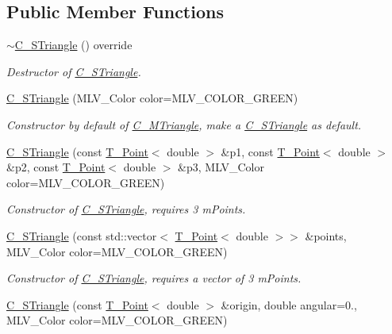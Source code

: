 \subsection*{Public Member Functions}
\begin{DoxyCompactItemize}
\item 
\hyperlink{classC__STriangle_a545f9a8f64e89a4b1269f7ea93251e64}{$\sim$\+C\+\_\+\+S\+Triangle} () override
\begin{DoxyCompactList}\small\item\em Destructor of \hyperlink{classC__STriangle}{C\+\_\+\+S\+Triangle}. \end{DoxyCompactList}\item 
\hyperlink{classC__STriangle_a3fcf5957768e63aded3872349d3a0397}{C\+\_\+\+S\+Triangle} (M\+L\+V\+\_\+\+Color color=M\+L\+V\+\_\+\+C\+O\+L\+O\+R\+\_\+\+G\+R\+E\+EN)
\begin{DoxyCompactList}\small\item\em Constructor by default of \hyperlink{classC__MTriangle}{C\+\_\+\+M\+Triangle}, make a \hyperlink{classC__STriangle}{C\+\_\+\+S\+Triangle} as default. \end{DoxyCompactList}\item 
\hyperlink{classC__STriangle_a7d3fe40c752838aab0116af91b3a2b28}{C\+\_\+\+S\+Triangle} (const \hyperlink{classT__Point}{T\+\_\+\+Point}$<$ double $>$ \&p1, const \hyperlink{classT__Point}{T\+\_\+\+Point}$<$ double $>$ \&p2, const \hyperlink{classT__Point}{T\+\_\+\+Point}$<$ double $>$ \&p3, M\+L\+V\+\_\+\+Color color=M\+L\+V\+\_\+\+C\+O\+L\+O\+R\+\_\+\+G\+R\+E\+EN)
\begin{DoxyCompactList}\small\item\em Constructor of \hyperlink{classC__STriangle}{C\+\_\+\+S\+Triangle}, requires 3 m\+Points. \end{DoxyCompactList}\item 
\hyperlink{classC__STriangle_acaabdb10b1689d1b26f655c266d34996}{C\+\_\+\+S\+Triangle} (const std\+::vector$<$ \hyperlink{classT__Point}{T\+\_\+\+Point}$<$ double $>$$>$ \&points, M\+L\+V\+\_\+\+Color color=M\+L\+V\+\_\+\+C\+O\+L\+O\+R\+\_\+\+G\+R\+E\+EN)
\begin{DoxyCompactList}\small\item\em Constructor of \hyperlink{classC__STriangle}{C\+\_\+\+S\+Triangle}, requires a vector of 3 m\+Points. \end{DoxyCompactList}\item 
\hyperlink{classC__STriangle_aee7b2ac8280dde9b86f5c3ad973fd692}{C\+\_\+\+S\+Triangle} (const \hyperlink{classT__Point}{T\+\_\+\+Point}$<$ double $>$ \&origin, double angular=0., M\+L\+V\+\_\+\+Color color=M\+L\+V\+\_\+\+C\+O\+L\+O\+R\+\_\+\+G\+R\+E\+EN)
$$
\end{DoxyCompactItemize}
